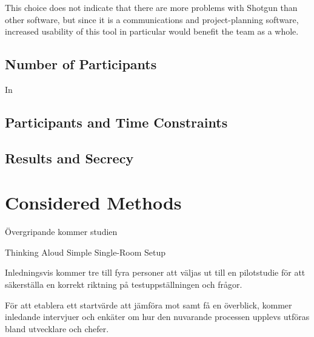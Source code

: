\documentclass{article}
\begin{document}
    This choice does not indicate that there are more problems with Shotgun
    than other software, but since it is a communications and project-planning
    software, increased usability of this tool in particular would benefit the
    team as a whole.


  \subsection{Number of Participants}

    In 


  \subsection{Participants and Time Constraints}

  \subsection{Results and Secrecy}

\section{Considered Methods}

  Övergripande kommer studien

Thinking Aloud \cite[p.204]{c_handbook_usability}
Simple Single-Room Setup \cite[p.101]{c_handbook_usability}

  Inledningsvis kommer tre till fyra personer att väljas ut till en
  pilotstudie för att säkerställa en korrekt riktning på testuppställningen och
  frågor.

  För att etablera ett startvärde att jämföra mot samt få en överblick, kommer
  inledande intervjuer och enkäter om hur den nuvarande processen upplevs
  utföras bland utvecklare och chefer. \\
\end{document}
